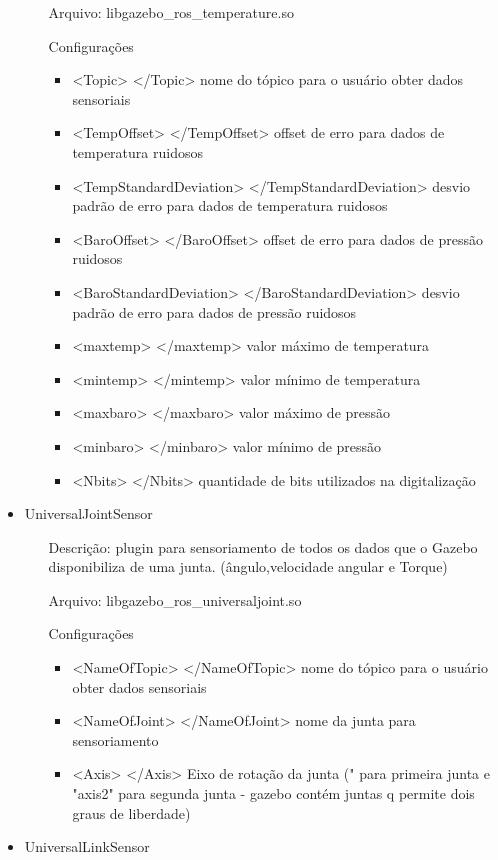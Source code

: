 \begin{itemize}
\begin{itemize}
\item[Arquivo:] libgazebo\_ros\_temperature.so
\item[Configurações]
\begin{itemize}
\item <Topic> </Topic> nome do tópico para o usuário obter dados sensoriais
\item <TempOffset> </TempOffset> offset de erro para dados de temperatura ruidosos
\item <TempStandardDeviation> </TempStandardDeviation> desvio padrão  de erro para dados de temperatura ruidosos
\item <BaroOffset> </BaroOffset> offset de erro para dados de pressão ruidosos
\item <BaroStandardDeviation> </BaroStandardDeviation> desvio padrão  de erro para dados de pressão ruidosos
\item <maxtemp> </maxtemp> valor máximo de temperatura
\item <mintemp> </mintemp> valor mínimo de temperatura
\item <maxbaro> </maxbaro> valor máximo de pressão
\item <minbaro> </minbaro> valor mínimo de pressão
\item <Nbits> </Nbits> quantidade de bits utilizados na digitalização
\end{itemize}
\end{itemize}
\item UniversalJointSensor
\begin{itemize}
\item[Descrição:] plugin para sensoriamento de todos os dados que o Gazebo disponibiliza de uma junta. (ângulo,velocidade angular e Torque)\\ 
\item[Arquivo:] libgazebo\_ros\_universaljoint.so
\item[Configurações]
\begin{itemize}
\item <NameOfTopic> </NameOfTopic> nome do tópico para o usuário obter dados sensoriais
\item <NameOfJoint> </NameOfJoint> nome da junta para sensoriamento
\item <Axis> </Axis> Eixo de rotação da junta (" para primeira junta e "axis2" para segunda junta - gazebo contém juntas q permite dois graus de liberdade)
\end{itemize}
\end{itemize}
\item UniversalLinkSensor

\end{itemize}

